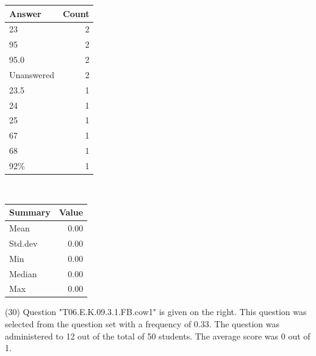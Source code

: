 \documentclass[12pt,english,nohyper]{tufte-handout}\usepackage[]{graphicx}\usepackage[]{color}
\begin{document}
\begin{center}%
\begin{tabular}{lr}
  \hline
Answer & Count \\ 
  \hline
23 &   2 \\ 
  95 &   2 \\ 
  95.0 &   2 \\ 
  Unanswered &   2 \\ 
  23.5 &   1 \\ 
  24 &   1 \\ 
  25 &   1 \\ 
  67 &   1 \\ 
  68 &   1 \\ 
  92\% &   1 \\ 
   \hline
\end{tabular}
~~~~~~~~%
\begin{tabular}{lr}
  \hline
Summary & Value \\ 
  \hline
Mean & 0.00 \\ 
  Std.dev & 0.00 \\ 
  Min & 0.00 \\ 
  Median & 0.00 \\ 
  Max & 0.00 \\ 
   \hline
\end{tabular}
\end{center}\newpage{} (30) Question "T06.E.K.09.3.1.FB.cow1" is given on the right. This question was selected from the question set with a frequency of 0.33. The question was administered to 12 out of the total of 50 students. The average score was 0 out of 1.
\end{document}
